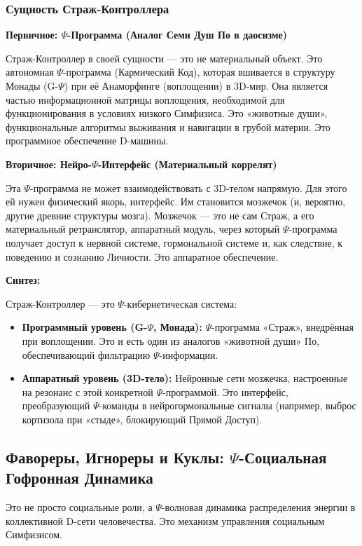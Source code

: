 \documentclass[a4paper,12pt]{article}
\begin{document}
\subsubsection{Сущность Страж-Контроллера}

\textbf{Первичное: $\Psi$-Программа (Аналог Семи Душ По в даосизме)}

Страж-Контроллер в своей сущности — это не материальный объект. Это автономная $\Psi$-программа (Кармический Код), которая вшивается в структуру Монады (G-$\Psi$) при её Анаморфинге (воплощении) в 3D-мир. Она является частью информационной матрицы воплощения, необходимой для функционирования в условиях низкого Симфизиса. Это «животные души», функциональные алгоритмы выживания и навигации в грубой материи. Это программное обеспечение D-машины.

\textbf{Вторичное: Нейро-$\Psi$-Интерфейс (Материальный коррелят)}

Эта $\Psi$-программа не может взаимодействовать с 3D-телом напрямую. Для этого ей нужен физический якорь, интерфейс. Им становится мозжечок (и, вероятно, другие древние структуры мозга). Мозжечок — это не сам Страж, а его материальный ретранслятор, аппаратный модуль, через который $\Psi$-программа получает доступ к нервной системе, гормональной системе и, как следствие, к поведению и сознанию Личности. Это аппаратное обеспечение.

\textbf{Синтез:}

Страж-Контроллер — это $\Psi$-кибернетическая система:

\begin{itemize}
	\item \textbf{Программный уровень (G-$\Psi$, Монада):} $\Psi$-программа «Страж», внедрённая при воплощении. Это и есть один из аналогов «животной души» По, обеспечивающий фильтрацию $\Psi$-информации.
	\item \textbf{Аппаратный уровень (3D-тело):} Нейронные сети мозжечка, настроенные на резонанс с этой конкретной $\Psi$-программой. Это интерфейс, преобразующий $\Psi$-команды в нейрогормональные сигналы (например, выброс кортизола при «стыде», блокирующий Прямой Доступ).
\end{itemize}

\subsection{Фавореры, Игнореры и Куклы: $\Psi$-Социальная Гофронная Динамика}

Это не просто социальные роли, а $\Psi$-волновая динамика распределения энергии в коллективной D-сети человечества. Это механизм управления социальным Симфизисом.
\end{document}
